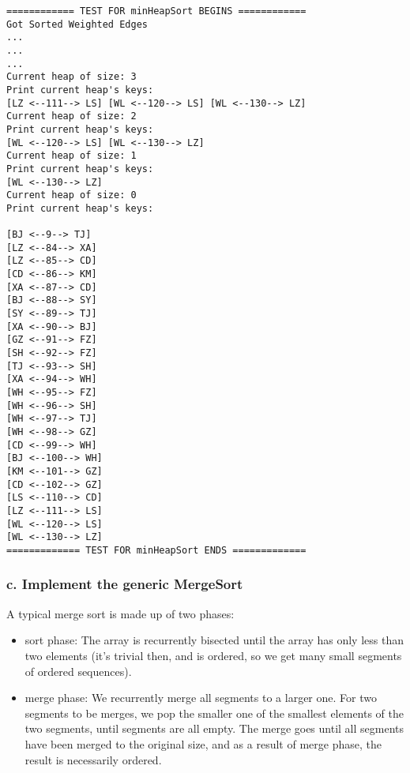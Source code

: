 \begin{verbatim}
============ TEST FOR minHeapSort BEGINS ============
Got Sorted Weighted Edges
...
...
...
Current heap of size: 3
Print current heap's keys:
[LZ <--111--> LS] [WL <--120--> LS] [WL <--130--> LZ] 
Current heap of size: 2
Print current heap's keys:
[WL <--120--> LS] [WL <--130--> LZ] 
Current heap of size: 1
Print current heap's keys:
[WL <--130--> LZ] 
Current heap of size: 0
Print current heap's keys:

[BJ <--9--> TJ]
[LZ <--84--> XA]
[LZ <--85--> CD]
[CD <--86--> KM]
[XA <--87--> CD]
[BJ <--88--> SY]
[SY <--89--> TJ]
[XA <--90--> BJ]
[GZ <--91--> FZ]
[SH <--92--> FZ]
[TJ <--93--> SH]
[XA <--94--> WH]
[WH <--95--> FZ]
[WH <--96--> SH]
[WH <--97--> TJ]
[WH <--98--> GZ]
[CD <--99--> WH]
[BJ <--100--> WH]
[KM <--101--> GZ]
[CD <--102--> GZ]
[LS <--110--> CD]
[LZ <--111--> LS]
[WL <--120--> LS]
[WL <--130--> LZ]
============= TEST FOR minHeapSort ENDS =============
\end{verbatim}

\subsubsection*{c. Implement the generic \textbf{MergeSort}}

A typical merge sort is made up of two phases:
\begin{itemize}
    \item sort phase: The array is recurrently bisected until the array has only less than two elements (it's trivial then, and is ordered, so we get many small segments of ordered sequences).
    \item merge phase: We recurrently merge all segments to a larger one. For two segments to be merges, we pop the smaller one of the smallest elements of the two segments, until segments are all empty. The merge goes until all segments have been merged to the original size, and as a result of merge phase, the result is necessarily ordered.
\end{itemize}

